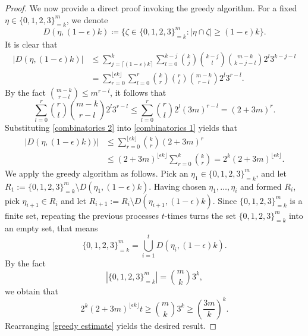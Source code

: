 \documentclass{amsbook}
\theoremstyle{definition}
\theoremstyle{remark}
\numberwithin{section}{chapter}
\numberwithin{equation}{chapter}
\newcommand{\1}{\mathbf{1}}
\begin{document}
\begin{proof}
We now provide a direct proof invoking the greedy algorithm. For a fixed $\eta\in \{0,1,2,3\}^{m}_{=k}$, we denote
\[
D(\eta,(1-\epsilon)k)\coloneqq \{\zeta\in \{0,1,2,3\}^{m}_{=k}:|\eta\cap \zeta|\geq (1-\epsilon)k\}.
\]
It is clear that
\begin{equation}\label{combinatorics 1}
\begin{split}
|D(\eta,(1-\epsilon)k)|&\leq\sum_{j=\lceil (1-\varepsilon)k\rceil}^{k}\sum_{l=0}^{k-j}\binom{k}{j}\binom{k-j}{l}\binom{m-k}{k-j-l}2^{l}3^{k-j-l}\\
&=\sum_{r=0}^{\lfloor \epsilon k\rfloor}\sum_{l=0}^{r}\binom{k}{r}\binom{r}{l}\binom{m-k}{r-l}2^{l}3^{r-l}.
\end{split}
\end{equation}
By the fact $\binom{m-k}{r-l}\leq m^{r-l}$, it follows that
\begin{equation}\label{combinatorics 2}
\sum_{l=0}^{r}\binom{r}{l}\binom{m-k}{r-l}2^{l}3^{r-l}\leq \sum_{l=0}^{r}\binom{r}{l}2^{l}(3m)^{r-l}=(2+3m)^{r}.
\end{equation}
Substituting \eqref{combinatorics 2} into \eqref{combinatorics 1} yields that
\begin{equation}\label{combinatorics 3}
\begin{split}
|D(\eta,(1-\epsilon)k))|&\leq \sum_{r=0}^{\lfloor \epsilon k\rfloor}\binom{k}{r}(2+3m)^{r}\\
&\leq(2+3m)^{\lfloor \epsilon k\rfloor}\sum_{r=0}^{k}\binom{k}{r}=2^{k}(2+3m)^{\lfloor \epsilon k\rfloor}.
\end{split}
\end{equation}
We apply the greedy algorithm as follows. Pick an $\eta_{1}\in \{0,1,2,3\}^{m}_{=k}$, and let $R_1:=\{0,1,2,3\}^m_{=k}\setminus D(\eta_1,(1-\epsilon)k)$. Having chosen $\eta_1,\dots,\eta_i$ and formed $R_{i}$, pick $\eta_{i+1}\in R_i$ and let $R_{i+1}:=R_{i}\setminus D(\eta_{i+1},(1-\epsilon)k)$.
Since $\{0,1,2,3\}^{m}_{=k}$ is a finite set, repeating the previous processes $t$-times turns the set $\{0,1,2,3\}^{m}_{=k}$ into an empty set, that means
\[\{0,1,2,3\}^{m}_{=k}=\bigcup_{i=1}^tD(\eta_{i},(1-\epsilon)k).\]
By the fact
\[
|\{0,1,2,3\}^{m}_{=k}|=\binom{m}{k}3^{k},
\]
we obtain that
\begin{equation}\label{greedy estimate}
2^{k}(2+3m)^{\lfloor \epsilon k\rfloor}t\geq \binom{m}{k}3^{k}\geq \left(\frac{3m}{k}\right)^{k}.
\end{equation}
Rearranging \eqref{greedy estimate} yields the desired result.
\end{proof}
\end{document}
